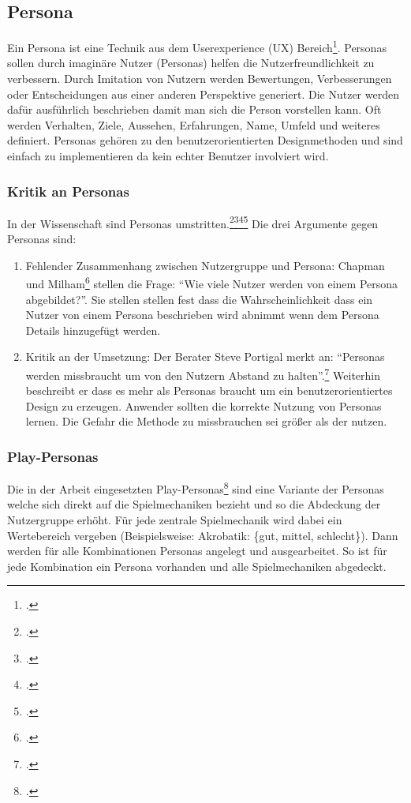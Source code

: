 \subsection{Persona}\label{ssec:persona}
	Ein Persona ist eine Technik aus dem Userexperience (UX) Bereich\footcite{persona}. Personas sollen durch imaginäre Nutzer (Personas) helfen die Nutzerfreundlichkeit zu verbessern. Durch Imitation von Nutzern werden Bewertungen, Verbesserungen oder Entscheidungen aus einer anderen Perspektive generiert. Die Nutzer werden dafür ausführlich beschrieben damit man sich die Person vorstellen kann. Oft werden Verhalten, Ziele, Aussehen, Erfahrungen, Name, Umfeld und weiteres definiert.
	Personas gehören zu den benutzerorientierten Designmethoden und sind einfach zu implementieren da kein echter Benutzer involviert wird.
	\subsubsection{Kritik an Personas}
		In der Wissenschaft sind Personas umstritten.\footcite{persona-crit}\footcite{persona-crit2}\footcite{persona-crit3}\footcite{persona-crit4} Die drei Argumente gegen Personas sind:
		\begin{enumerate}\obeylines
			\item{ Fehlender Zusammenhang zwischen Nutzergruppe und Persona: Chapman und Milham\footcite{persona-crit} stellen die Frage: \enquote{Wie viele Nutzer werden von einem Persona abgebildet?}. Sie stellen stellen fest dass die Wahrscheinlichkeit dass ein Nutzer von einem Persona beschrieben wird abnimmt wenn dem Persona Details hinzugefügt werden. }
			\item{ Kritik an der Umsetzung: Der Berater Steve Portigal merkt an: \enquote{Personas werden missbraucht um von den Nutzern Abstand zu halten}.\footcite[Übersetzt aus dem Orginal: \enquote{Personas are misused to maintain a “safe” distance from the people we design for [\dots]}]{persona-crit4}
			Weiterhin beschreibt er dass es mehr als Personas braucht um ein benutzerorientiertes Design zu erzeugen. Anwender sollten die korrekte Nutzung von Personas lernen.
			Die Gefahr die Methode zu missbrauchen sei größer als der nutzen. }
		\end{enumerate}
	\subsubsection{Play-Personas}
		Die in der Arbeit eingesetzten Play-Personas\footcite{play-persona} sind eine Variante der Personas welche sich direkt auf die Spielmechaniken bezieht und so die Abdeckung der Nutzergruppe erhöht. Für jede zentrale Spielmechanik wird dabei ein Wertebereich vergeben (Beispielsweise: Akrobatik: \{gut, mittel, schlecht\}). Dann werden für alle Kombinationen Personas angelegt und ausgearbeitet. So ist für jede Kombination ein Persona vorhanden und alle Spielmechaniken abgedeckt.
